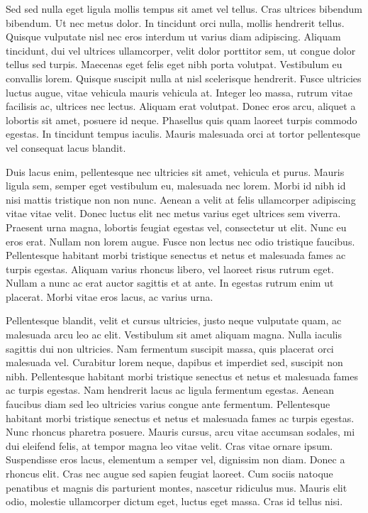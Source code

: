 Sed sed nulla eget ligula mollis tempus sit amet vel tellus.
Cras ultrices bibendum bibendum.
Ut nec metus dolor.
In tincidunt orci nulla, mollis hendrerit tellus.
Quisque vulputate nisl nec eros interdum ut varius diam adipiscing.
Aliquam tincidunt, dui vel ultrices ullamcorper, velit dolor porttitor sem, ut congue dolor tellus sed turpis.
Maecenas eget felis eget nibh porta volutpat.
Vestibulum eu convallis lorem.
Quisque suscipit nulla at nisl scelerisque hendrerit.
Fusce ultricies luctus augue, vitae vehicula mauris vehicula at.
Integer leo massa, rutrum vitae facilisis ac, ultrices nec lectus.
Aliquam erat volutpat.
Donec eros arcu, aliquet a lobortis sit amet, posuere id neque.
Phasellus quis quam laoreet turpis commodo egestas.
In tincidunt tempus iaculis.
Mauris malesuada orci at tortor pellentesque vel consequat lacus blandit.

Duis lacus enim, pellentesque nec ultricies sit amet, vehicula et purus.
Mauris ligula sem, semper eget vestibulum eu, malesuada nec lorem.
Morbi id nibh id nisi mattis tristique non non nunc.
Aenean a velit at felis ullamcorper adipiscing vitae vitae velit.
Donec luctus elit nec metus varius eget ultrices sem viverra.
Praesent urna magna, lobortis feugiat egestas vel, consectetur ut elit.
Nunc eu eros erat.
Nullam non lorem augue.
Fusce non lectus nec odio tristique faucibus.
Pellentesque habitant morbi tristique senectus et netus et malesuada fames ac turpis egestas.
Aliquam varius rhoncus libero, vel laoreet risus rutrum eget.
Nullam a nunc ac erat auctor sagittis et at ante.
In egestas rutrum enim ut placerat.
Morbi vitae eros lacus, ac varius urna.

Pellentesque blandit, velit et cursus ultricies, justo neque vulputate quam, ac malesuada arcu leo ac elit.
Vestibulum sit amet aliquam magna.
Nulla iaculis sagittis dui non ultricies.
Nam fermentum suscipit massa, quis placerat orci malesuada vel.
Curabitur lorem neque, dapibus et imperdiet sed, suscipit non nibh.
Pellentesque habitant morbi tristique senectus et netus et malesuada fames ac turpis egestas.
Nam hendrerit lacus ac ligula fermentum egestas.
Aenean faucibus diam sed leo ultricies varius congue ante fermentum.
Pellentesque habitant morbi tristique senectus et netus et malesuada fames ac turpis egestas.
Nunc rhoncus pharetra posuere.
Mauris cursus, arcu vitae accumsan sodales, mi dui eleifend felis, at tempor magna leo vitae velit.
Cras vitae ornare ipsum.
Suspendisse eros lacus, elementum a semper vel, dignissim non diam.
Donec a rhoncus elit.
Cras nec augue sed sapien feugiat laoreet.
Cum sociis natoque penatibus et magnis dis parturient montes, nascetur ridiculus mus.
Mauris elit odio, molestie ullamcorper dictum eget, luctus eget massa.
Cras id tellus nisi.

